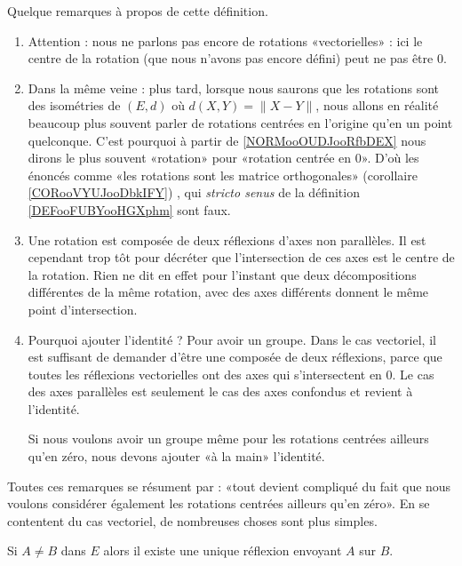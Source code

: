 \begin{normaltext}
    Quelque remarques à propos de cette définition.
    \begin{enumerate}
        \item
            Attention : nous ne parlons pas encore de rotations «vectorielles» : ici le centre de la rotation (que nous n'avons pas encore défini) peut ne pas être \( 0\).
        \item
            Dans la même veine : plus tard, lorsque nous saurons que les rotations sont des isométries de \( (E,d)\) où \( d(X,Y)=\| X-Y \|\), nous allons en réalité beaucoup plus souvent parler de rotations centrées en l'origine qu'en un point quelconque. C'est pourquoi à partir de \ref{NORMooOUDJooRfbDEX} nous dirons le plus souvent «rotation»  pour «rotation centrée en \( 0\)». D'où les énoncés comme «les rotations sont les matrice orthogonales» (corollaire \ref{CORooVYUJooDbkIFY}) , qui \emph{stricto senus} de la définition \ref{DEFooFUBYooHGXphm} sont faux.
        \item
            Une rotation est composée de deux réflexions d'axes non parallèles. Il est cependant trop tôt pour décréter que l'intersection de ces axes est le centre de la rotation. Rien ne dit en effet pour l'instant que deux décompositions différentes de la même rotation, avec des axes différents donnent le même point d'intersection.
        \item
            Pourquoi ajouter l'identité  ? Pour avoir un groupe. Dans le cas vectoriel, il est suffisant de demander d'être une composée de deux réflexions, parce que toutes les réflexions vectorielles ont des axes qui s'intersectent en \( 0\). Le cas des axes parallèles est seulement le cas des axes confondus et revient à l'identité.

            Si nous voulons avoir un groupe même pour les rotations centrées ailleurs qu'en zéro, nous devons ajouter «à la main» l'identité.
    \end{enumerate}

    Toutes ces remarques se résument par : «tout devient compliqué du fait que nous voulons considérer également les rotations centrées ailleurs qu'en zéro». En se contentent du cas vectoriel, de nombreuses choses sont plus simples.
\end{normaltext}

\begin{corollary}       \label{CORooNKKIooPGOUJl}
    Si \( A\neq B\) dans \( E\) alors il existe une unique réflexion envoyant \( A\) sur \( B\).
\end{corollary}


